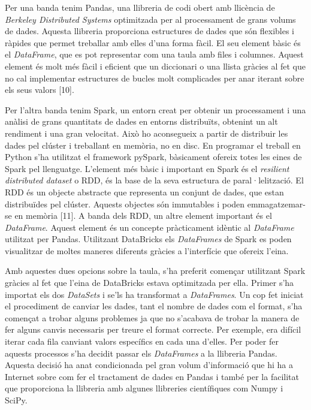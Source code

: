 \documentclass[10pt,a4paper,twocolumn,twoside]{article}
\begin{document}
Per una banda tenim Pandas, una llibreria de codi obert amb llicència de \textit{Berkeley Distributed Systems} optimitzada per al processament de grans volums de dades. Aquesta llibreria proporciona estructures de dades que són flexibles i ràpides que permet treballar amb elles d'una forma fàcil. El seu element bàsic és el \textit{DataFrame}, que es pot representar com una taula amb files i columnes. Aquest element és molt més fàcil i eficient que un diccionari o una llista gràcies al fet que no cal implementar estructures de bucles molt complicades per anar iterant sobre els seus valors [10].

Per l'altra banda tenim Spark, un entorn creat per obtenir un processament i una anàlisi de grans quantitats de dades en entorns distribuïts, obtenint un alt rendiment i una gran velocitat. Això ho aconsegueix a partir de distribuir les dades pel clúster i treballant en memòria, no en disc. En programar el treball en Python s'ha utilitzat el framework pySpark, bàsicament ofereix totes les eines de Spark pel llenguatge. L'element més bàsic i important en Spark és el \textit{resilient distributed dataset} o RDD, és la base de la seva estructura de paral·lelització. El RDD és un objecte abstracte que representa un conjunt de dades, que estan distribuïdes pel clúster. Aquests objectes són immutables i poden emmagatzemar-se en memòria [11]. A banda dels RDD, un altre element important és el \textit{DataFrame}. Aquest element és un concepte pràcticament idèntic al \textit{DataFrame} utilitzat per Pandas. Utilitzant DataBricks els \textit{DataFrames} de Spark es poden visualitzar de moltes maneres diferents gràcies a l'interfície que ofereix l'eina.

Amb aquestes dues opcions sobre la taula, s'ha preferit començar utilitzant Spark gràcies al fet que l'eina de DataBricks estava optimitzada per ella. Primer s'ha importat els dos \textit{DataSets} i se'ls ha transformat a \textit{DataFrames}. Un cop fet iniciat el procediment de canviar les dades, tant el nombre de dades com el format, s'ha començat a trobar alguns problemes ja que no s'acabava de trobar la manera de fer alguns canvis necessaris per treure el format correcte. Per exemple, era difícil iterar cada fila canviant valors específics en cada una d'elles. Per poder fer aquests processos s'ha decidit passar els \textit{DataFrames} a la llibreria Pandas. Aquesta decisió ha anat condicionada pel gran volum d'informació que hi ha a Internet sobre com fer el tractament de dades en Pandas i també per la facilitat que proporciona la llibreria amb algunes llibreries científiques com Numpy i SciPy.
\end{document}
